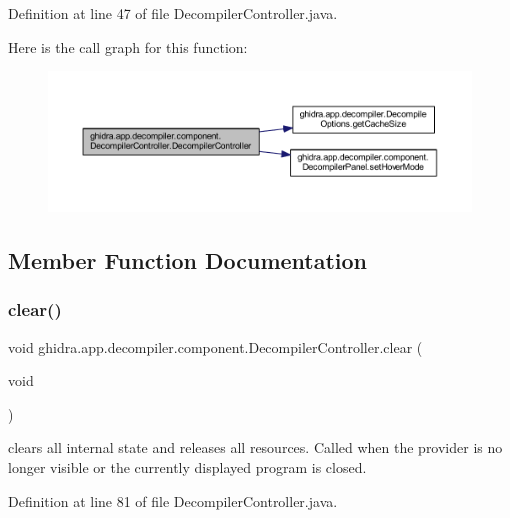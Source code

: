 Definition at line 47 of file Decompiler\+Controller.\+java.

Here is the call graph for this function\+:
\nopagebreak
\begin{figure}[H]
\begin{center}
\leavevmode
\includegraphics[width=350pt]{classghidra_1_1app_1_1decompiler_1_1component_1_1_decompiler_controller_a9e275629c64dc9e5a0672069c97b7d9f_cgraph}
\end{center}
\end{figure}


\subsection{Member Function Documentation}
\mbox{\label{classghidra_1_1app_1_1decompiler_1_1component_1_1_decompiler_controller_af8cd025cdb201c8b5e14f52a4357a65d}} 
\subsubsection{\texorpdfstring{clear()}{clear()}}
{\footnotesize\ttfamily void ghidra.\+app.\+decompiler.\+component.\+Decompiler\+Controller.\+clear (\begin{DoxyParamCaption}\item[{void}]{ }\end{DoxyParamCaption})\hspace{0.3cm}{\ttfamily [inline]}}

clears all internal state and releases all resources. Called when the provider is no longer visible or the currently displayed program is closed. 

Definition at line 81 of file Decompiler\+Controller.\+java.

